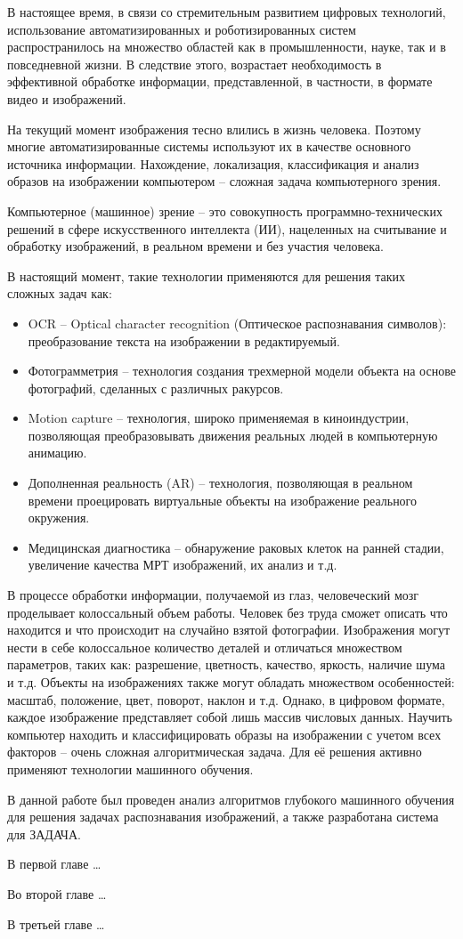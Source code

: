 
В настоящее время, в связи со стремительным развитием цифровых технологий, использование автоматизированных и роботизированных систем распространилось на множество областей как в промышленности, науке, так и в повседневной жизни. В следствие этого, возрастает необходимость в эффективной обработке информации, представленной, в частности, в формате видео и изображений. 

На текущий момент изображения тесно влились в жизнь человека. Поэтому многие автоматизированные системы используют их в качестве основного источника информации. Нахождение, локализация, классификация и анализ образов на изображении компьютером – сложная задача компьютерного зрения. 

Компьютерное (машинное) зрение – это совокупность программно-технических решений в сфере искусственного интеллекта (ИИ), нацеленных на считывание и обработку изображений, в реальном времени и без участия человека. 

В настоящий момент, такие технологии применяются для решения таких сложных задач как:
\begin{itemize}
    \item OCR – Optical character recognition (Оптическое распознавания символов): преобразование текста на изображении в редактируемый.
    \item Фотограмметрия – технология создания трехмерной модели объекта на основе фотографий, сделанных с различных ракурсов.
    \item Motion capture – технология, широко применяемая в киноиндустрии, позволяющая преобразовывать движения реальных людей в компьютерную анимацию.
    \item Дополненная реальность (AR) – технология, позволяющая в реальном времени проецировать виртуальные объекты на изображение реального окружения. 
    \item Медицинская диагностика – обнаружение раковых клеток на ранней стадии, увеличение качества МРТ изображений, их анализ и т.д.
\end{itemize}

В процессе обработки информации, получаемой из глаз, человеческий мозг проделывает колоссальный объем работы. Человек без труда сможет описать что находится и что происходит на случайно взятой фотографии. Изображения могут нести в себе колоссальное количество деталей и отличаться множеством параметров, таких как: разрешение, цветность, качество, яркость, наличие шума и т.д. Объекты на изображениях также могут обладать множеством особенностей: масштаб, положение, цвет, поворот, наклон и т.д. Однако, в цифровом формате, каждое изображение представляет собой лишь массив числовых данных.  Научить компьютер находить и классифицировать образы на изображении с учетом всех факторов – очень сложная алгоритмическая задача. Для её решения активно применяют технологии машинного обучения.

В данной работе был проведен анализ алгоритмов глубокого машинного обучения для решения задачах распознавания изображений, а также разработана система для ЗАДАЧА.

В первой главе …

Во второй главе …

В третьей главе …

\clearpage
